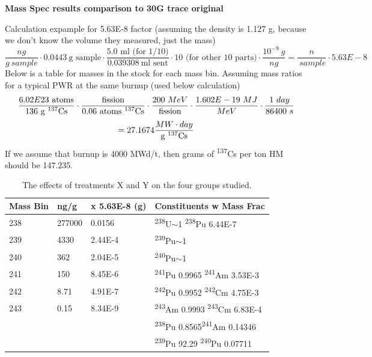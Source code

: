 \documentclass[idxtotoc,hyperref,openany,oneside]{labbook} %
\newcommand{\tss}{\textsuperscript}
\begin{document}
\begin{center}
\textbf{Mass Spec results comparison to 30G trace original}
\end{center}
Calculation expample for 5.63E-8 factor (assuming the density is 1.127 g, because
we don't know the volume they measured, just the mass)
\begin{equation*}
  \frac{ng}{g\ sample}\cdot0.0443\ \text{g sample}\cdot\frac{5.0\text{ ml (for 1/10)}}
       {0.039308\ \text{ml sent}}\cdot10\text{ (for other 10 parts)}\cdot
       \frac{10^{-9}\ g}{ng}=\frac{n}{\ sample}\cdot5.63E-8
\end{equation*}
Below is a table for masses in the stock for each mass bin.
Assuming mass ratios for a typical PWR at the same burnup (used below calculation)
\begin{equation*}
  \frac{6.02E23\text{ atoms}}{136\text{ g \tss{137}Cs}}\cdot
  \frac{\text{fission}}{0.06 \text{ atoms \tss{137}Cs}}
  \cdot\frac{200\ MeV}{\text{fission}}\cdot\frac{1.602E-19\ MJ}{MeV}\cdot\frac{1\ day}{86400\ s}
\end{equation*}
\begin{equation*}
  =27.1674\frac{MW\cdot day}{\text{g \tss{137}Cs}}
\end{equation*}
If we assume that burnup is 4000 MWd/t, then grams of \tss{137}Cs per ton HM should be 147.235.
\begin{table}[H]
\begin{center}
\begin{tabular}{l l l l}
\toprule
\textbf{Mass Bin} & \textbf{ng/g}& \textbf{x 5.63E-8 (g)} & \textbf{Constituents w Mass Frac}\\
\toprule
238 & 277000 & 0.0156 & \tss{238}U$\sim$1 \tss{238}Pu 6.44E-7\\
239 & 4330 & 2.44E-4 & \tss{239}Pu$\sim$1\\
240 & 362  & 2.04E-5 & \tss{240}Pu$\sim$1\\
241 & 150  & 8.45E-6 & \tss{241}Pu 0.9965 \tss{241}Am 3.53E-3\\
242 & 8.71 & 4.91E-7 & \tss{242}Pu 0.9952 \tss{242}Cm 4.75E-3\\
243 & 0.15 & 8.34E-9 & \tss{243}Am 0.9993 \tss{243}Cm 6.83E-4\\
& & & \tss{238}Pu 0.8565\tss{241}Am 0.14346\\
& & & \tss{239}Pu 92.29 \tss{240}Pu 0.07711\\
\bottomrule
\end{tabular}
\caption{The effects of treatments X and Y on the four groups studied.}
\label{tab:treatments_xy}
\end{center}
\end{table}
\end{document}
